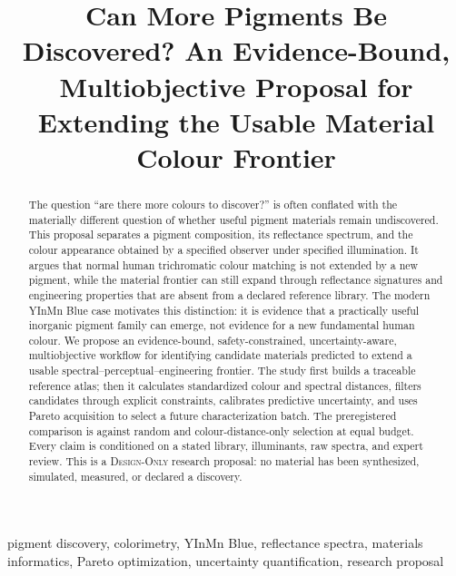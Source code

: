 \documentclass[conference]{IEEEtran}
\newcommand{\designonly}{\textsc{Design-Only}}
\begin{document}
\raggedbottom

\title{Can More Pigments Be Discovered? An Evidence-Bound, Multiobjective Proposal for Extending the Usable Material Colour Frontier}

\author{
}

\maketitle

\begin{abstract}
The question ``are there more colours to discover?'' is often conflated with the materially different question of whether useful pigment materials remain undiscovered. This proposal separates a pigment composition, its reflectance spectrum, and the colour appearance obtained by a specified observer under specified illumination. It argues that normal human trichromatic colour matching is not extended by a new pigment, while the material frontier can still expand through reflectance signatures and engineering properties that are absent from a declared reference library. The modern YInMn Blue case motivates this distinction: it is evidence that a practically useful inorganic pigment family can emerge, not evidence for a new fundamental human colour. We propose an evidence-bound, safety-constrained, uncertainty-aware, multiobjective workflow for identifying candidate materials predicted to extend a usable spectral--perceptual--engineering frontier. The study first builds a traceable reference atlas; then it calculates standardized colour and spectral distances, filters candidates through explicit constraints, calibrates predictive uncertainty, and uses Pareto acquisition to select a future characterization batch. The preregistered comparison is against random and colour-distance-only selection at equal budget. Every claim is conditioned on a stated library, illuminants, raw spectra, and expert review. This is a \designonly{} research proposal: no material has been synthesized, simulated, measured, or declared a discovery.
\end{abstract}

\begin{IEEEkeywords}
pigment discovery, colorimetry, YInMn Blue, reflectance spectra, materials informatics, Pareto optimization, uncertainty quantification, research proposal
\end{IEEEkeywords}
\end{document}
